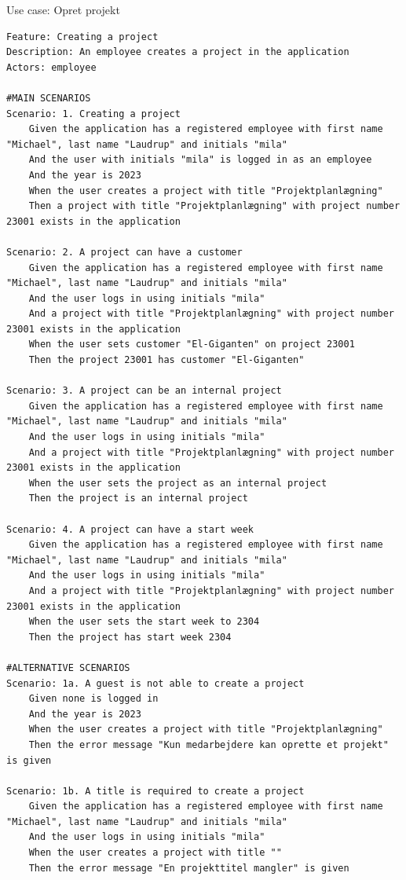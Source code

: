 \begin{listing}[H]
    \centering
    \caption{Use case: Opret projekt}\label{lst:usecase_create_project}
    \begin{verbatim}  
Feature: Creating a project
Description: An employee creates a project in the application
Actors: employee

#MAIN SCENARIOS
Scenario: 1. Creating a project
    Given the application has a registered employee with first name "Michael", last name "Laudrup" and initials "mila"
    And the user with initials "mila" is logged in as an employee
    And the year is 2023
    When the user creates a project with title "Projektplanlægning" 
    Then a project with title "Projektplanlægning" with project number 23001 exists in the application

Scenario: 2. A project can have a customer
    Given the application has a registered employee with first name "Michael", last name "Laudrup" and initials "mila"
    And the user logs in using initials "mila"
    And a project with title "Projektplanlægning" with project number 23001 exists in the application
    When the user sets customer "El-Giganten" on project 23001
    Then the project 23001 has customer "El-Giganten"

Scenario: 3. A project can be an internal project
    Given the application has a registered employee with first name "Michael", last name "Laudrup" and initials "mila"
    And the user logs in using initials "mila"
    And a project with title "Projektplanlægning" with project number 23001 exists in the application
    When the user sets the project as an internal project
    Then the project is an internal project

Scenario: 4. A project can have a start week
    Given the application has a registered employee with first name "Michael", last name "Laudrup" and initials "mila"
    And the user logs in using initials "mila"
    And a project with title "Projektplanlægning" with project number 23001 exists in the application
    When the user sets the start week to 2304
    Then the project has start week 2304

#ALTERNATIVE SCENARIOS
Scenario: 1a. A guest is not able to create a project
    Given none is logged in
    And the year is 2023
    When the user creates a project with title "Projektplanlægning" 
    Then the error message "Kun medarbejdere kan oprette et projekt" is given

Scenario: 1b. A title is required to create a project
    Given the application has a registered employee with first name "Michael", last name "Laudrup" and initials "mila"
    And the user logs in using initials "mila"
    When the user creates a project with title ""
    Then the error message "En projekttitel mangler" is given
    \end{verbatim}
\end{listing}
